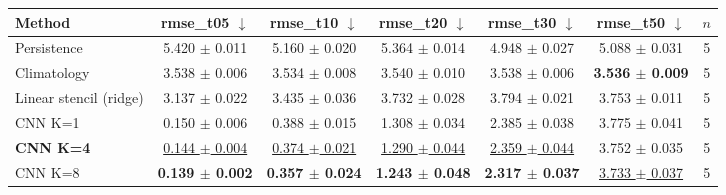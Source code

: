 \begin{tabular}{lcccccc}
\toprule
Method & rmse\_t05 $\downarrow$ & rmse\_t10 $\downarrow$ & rmse\_t20 $\downarrow$ & rmse\_t30 $\downarrow$ & rmse\_t50 $\downarrow$ & $n$ \\
\midrule
Persistence & 5.420 $\pm$ 0.011 & 5.160 $\pm$ 0.020 & 5.364 $\pm$ 0.014 & 4.948 $\pm$ 0.027 & 5.088 $\pm$ 0.031 & 5 \\
Climatology & 3.538 $\pm$ 0.006 & 3.534 $\pm$ 0.008 & 3.540 $\pm$ 0.010 & 3.538 $\pm$ 0.006 & \textbf{3.536 $\pm$ 0.009} & 5 \\
Linear stencil (ridge) & 3.137 $\pm$ 0.022 & 3.435 $\pm$ 0.036 & 3.732 $\pm$ 0.028 & 3.794 $\pm$ 0.021 & 3.753 $\pm$ 0.011 & 5 \\
CNN K=1 & 0.150 $\pm$ 0.006 & 0.388 $\pm$ 0.015 & 1.308 $\pm$ 0.034 & 2.385 $\pm$ 0.038 & 3.775 $\pm$ 0.041 & 5 \\
\textbf{CNN K=4} & \underline{0.144 $\pm$ 0.004} & \underline{0.374 $\pm$ 0.021} & \underline{1.290 $\pm$ 0.044} & \underline{2.359 $\pm$ 0.044} & 3.752 $\pm$ 0.035 & 5 \\
CNN K=8 & \textbf{0.139 $\pm$ 0.002} & \textbf{0.357 $\pm$ 0.024} & \textbf{1.243 $\pm$ 0.048} & \textbf{2.317 $\pm$ 0.037} & \underline{3.733 $\pm$ 0.037} & 5 \\
\bottomrule
\end{tabular}
